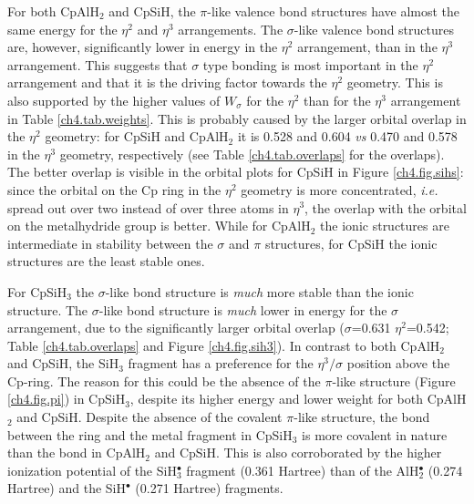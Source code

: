 For both CpAlH$_2$ and CpSiH, the $\pi$-like valence bond structures have almost the same energy for the $\eta^{2}$ and $\eta^{3}$ arrangements. The $\sigma$-like valence bond structures are, however, significantly lower in energy in the $\eta^{2}$ arrangement, than in the $\eta^{3}$ arrangement. This suggests that $\sigma$ type bonding is most important in the $\eta^2$ arrangement and that it is the driving factor towards the $\eta^2$ geometry. This is also supported by the higher values of $W_\sigma$ for the $\eta^2$ than for the $\eta^3$ arrangement in Table \ref{ch4.tab.weights}. This is probably caused by the larger orbital overlap in the $\eta^2$ geometry: for CpSiH and CpAlH$_2$ it is 0.528 and 0.604 \textit{vs} 0.470 and 0.578 in the $\eta^3$ geometry, respectively (see Table \ref{ch4.tab.overlaps} for the overlaps). The better overlap is visible in the orbital plots for CpSiH in Figure \ref{ch4.fig.sihs}: since the orbital on the Cp ring in the $\eta^2$ geometry is more concentrated, \textit{i.e.} spread out over two instead of over three atoms in $\eta^3$, the overlap with the orbital on the metalhydride group is better. While for CpAlH$_2$ the ionic structures are intermediate in stability between the $\sigma$ and $\pi$ structures, for CpSiH the ionic structures are the least stable ones.

For CpSiH$_3$ the $\sigma$-like bond structure is \textit{much} more stable than the ionic structure. The $\sigma$-like bond structure is \textit{much} lower in energy for the $\sigma$ arrangement, due to the significantly larger orbital overlap ($\sigma$=0.631 $\eta^2$=0.542; Table \ref{ch4.tab.overlaps} and Figure \ref{ch4.fig.sih3}). In contrast to both CpAlH$_2$ and CpSiH, the SiH$_3$ fragment has a preference for the $\eta^3 / \sigma$ position above the Cp-ring. The reason for this could be the absence of the $\pi$-like structure (Figure \ref{ch4.fig.pi}) in CpSiH$_3$, despite its higher energy and lower weight for both CpAlH$_2$ and CpSiH. Despite the absence of the covalent $\pi$-like structure, the bond between the ring and the metal fragment in CpSiH$_3$ is more covalent in nature than the bond in CpAlH$_2$ and CpSiH. This is also corroborated by the higher ionization potential of the SiH$_3^{\bullet}$ fragment (0.361 Hartree) than of the AlH$_2^{\bullet}$ (0.274 Hartree) and the SiH$^{\bullet}$ (0.271 Hartree) fragments.

